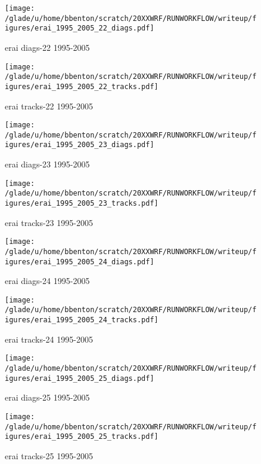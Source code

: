 \begin{figure}[!tbp]
\centering
\begin{minipage}[b]{0.45\textwidth}
\texttt{[image: /glade/u/home/bbenton/scratch/20XXWRF/RUNWORKFLOW/writeup/figures/erai\_1995\_2005\_22\_diags.pdf]}
\caption{erai diags-22 1995-2005}
\end{minipage}
\hfill
\begin{minipage}[b]{0.45\textwidth}
\texttt{[image: /glade/u/home/bbenton/scratch/20XXWRF/RUNWORKFLOW/writeup/figures/erai\_1995\_2005\_22\_tracks.pdf]}
\caption{erai tracks-22 1995-2005}
\end{minipage}
\end{figure}
\begin{figure}[!tbp]
\centering
\begin{minipage}[b]{0.45\textwidth}
\texttt{[image: /glade/u/home/bbenton/scratch/20XXWRF/RUNWORKFLOW/writeup/figures/erai\_1995\_2005\_23\_diags.pdf]}
\caption{erai diags-23 1995-2005}
\end{minipage}
\hfill
\begin{minipage}[b]{0.45\textwidth}
\texttt{[image: /glade/u/home/bbenton/scratch/20XXWRF/RUNWORKFLOW/writeup/figures/erai\_1995\_2005\_23\_tracks.pdf]}
\caption{erai tracks-23 1995-2005}
\end{minipage}
\end{figure}
\begin{figure}[!tbp]
\centering
\begin{minipage}[b]{0.45\textwidth}
\texttt{[image: /glade/u/home/bbenton/scratch/20XXWRF/RUNWORKFLOW/writeup/figures/erai\_1995\_2005\_24\_diags.pdf]}
\caption{erai diags-24 1995-2005}
\end{minipage}
\hfill
\begin{minipage}[b]{0.45\textwidth}
\texttt{[image: /glade/u/home/bbenton/scratch/20XXWRF/RUNWORKFLOW/writeup/figures/erai\_1995\_2005\_24\_tracks.pdf]}
\caption{erai tracks-24 1995-2005}
\end{minipage}
\end{figure}
\begin{figure}[!tbp]
\centering
\begin{minipage}[b]{0.45\textwidth}
\texttt{[image: /glade/u/home/bbenton/scratch/20XXWRF/RUNWORKFLOW/writeup/figures/erai\_1995\_2005\_25\_diags.pdf]}
\caption{erai diags-25 1995-2005}
\end{minipage}
\hfill
\begin{minipage}[b]{0.45\textwidth}
\texttt{[image: /glade/u/home/bbenton/scratch/20XXWRF/RUNWORKFLOW/writeup/figures/erai\_1995\_2005\_25\_tracks.pdf]}
\caption{erai tracks-25 1995-2005}
\end{minipage}
\end{figure}
